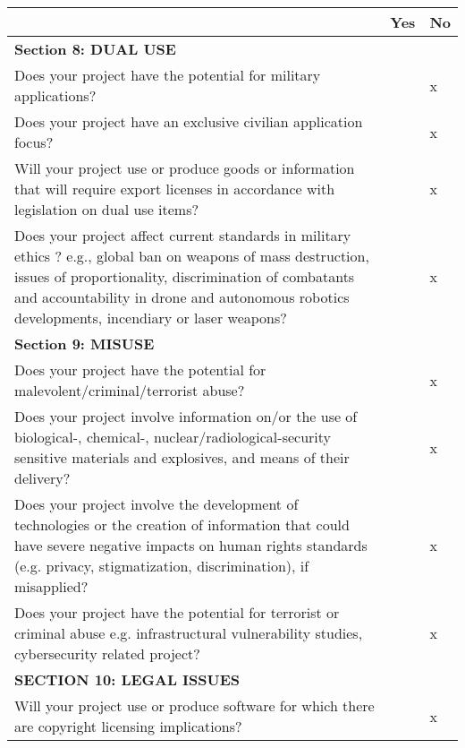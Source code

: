 \documentclass[a4paper,11pt,titlepage]{article}
\begin{document}
\begin{table}[h!]
    \centering
    \begin{tabular}{|p{12.3cm}|l | l |}
    \hline         
    & Yes & No 															  \\ \hline
        \cellcolor{green!20}\textbf{Section 8: DUAL USE} &  &  						  \\ \hline
        Does your project have the potential for military applications? &  & x 				  \\ \hline
        Does your project have an exclusive civilian application focus? &  & x 			  \\ \hline
        Will your project use or produce goods or information that will require 
        export licenses in accordance with legislation on dual use items? &  & x 			  \\ \hline
        Does your project affect current standards in military ethics ? e.g., 
        global ban on weapons of mass destruction, issues of
         proportionality, discrimination of combatants and accountability 
         in drone and autonomous robotics 
        developments, incendiary or laser weapons? &  & x 							  \\ \hline
        \cellcolor{green!20}\textbf{Section 9: MISUSE} &  &  							  \\ \hline
        Does your project have the potential for 
        malevolent/criminal/terrorist abuse? &  & x 								  \\ \hline
        Does your project involve information on/or the use of biological-,
        chemical-, nuclear/radiological-security sensitive materials and explosives, 
        and means of their delivery? &  & x 										  \\ \hline
        Does your project involve the development of technologies or the 
        creation of information that could have severe negative impacts on human 
        rights standards (e.g. privacy, stigmatization, discrimination), if misapplied? &  & x 	  \\ \hline
        Does your project have the potential for terrorist or criminal abuse e.g.
        infrastructural vulnerability studies, cybersecurity related project? &  & x 			  \\ \hline
        \cellcolor{green!20}\textbf{SECTION 10: LEGAL ISSUES} &  &  				  \\ \hline
        Will your project use or produce software for which there 
        are copyright licensing implications? &  & x 								  \\ \hline

\end{tabular}
\end{table}
\end{document}
